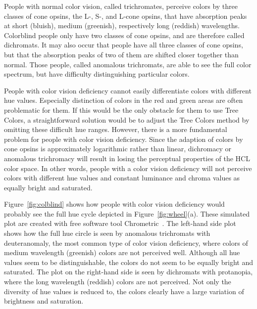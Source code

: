 \documentclass[journal]{vgtc}                %
\begin{document}
People with normal color vision, called trichromates, perceive colors by three classes of cone opsins, the L-, S-, and L-cone opsins, that have absorption peaks at short (bluish), medium (greenish),  respectively long (reddish) wavelengths. Colorblind people only have two classes of cone opsins, and are therefore called dichromats. It may also occur that people have all three classes of cone opsins, but that the absorption peaks of two of them are shifted closer together than normal. Those people, called anomalous trichromats, are able to see the full color spectrum, but have difficulty distinguishing particular colors.


People with color vision deficiency cannot easily differentiate colors with different hue values. Especially distinction of colors in the red and green areas are often problematic for them. If this would be the only obstacle for them to use Tree Colors, a straightforward solution would be to adjust the Tree Colors method by omitting these difficult hue ranges. However, there is a more fundamental problem for people with color vision deficiency. Since the adaption of colors by cone opsins is approximately logarithmic rather than linear, dichromacy or anomalous trichromacy will result in losing the perceptual properties of the HCL color space. In other words, people with a color vision deficiency will not perceive colors with different hue values and constant luminance and chroma values as equally bright and saturated. 

Figure~\ref{fig:colblind} shows how people with color vision deficiency would probably see the full hue cycle depicted in Figure~\ref{fig:wheel}(a). These simulated plot are created with free software tool Chrometric~\cite{chrometric}. The left-hand side plot shows how the full hue circle is seen by anomalous trichromats with deuteranomaly, the most common type of color vision deficiency, where colors of medium wavelength (greenish) colors are not perceived well. Although all hue values seem to be distinguishable, the colors do not seem to be equally bright and saturated. The plot on the right-hand side is seen by dichromats with protanopia, where the long wavelength (reddish) colors are not perceived. Not only the diversity of hue values is reduced to, the colors clearly have a large variation of brightness and saturation.
\end{document}
